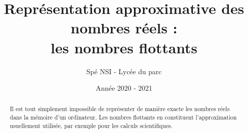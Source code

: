 



\author{Spé NSI - Lycée du parc}  %
\title{Représentation approximative des nombres réels : \\ {les nombres flottants}}  %
\date{Année 2020 - 2021} %
\renewcommand{\thesection}{\Roman{section}}  %
\pagestyle{fancy}



\fancyfoot[C]{\thepage} %
\fancyfoot[L]{} %
\fancyfoot[R]{} %
\newcommand{\p}[1]{ \left( #1 \right)}   %
\newcommand\abs[1]{|{#1}|}
\newcommand{\intent}[2]{[\![ #1 , #2 ]\!]} %
\newcommand{\pe}[1]{ \left\lfloor #1 \right\rfloor} %

\maketitle  %
\vspace{0.2cm}
\maketitle  %
\thispagestyle{empty}

\renewcommand{\abstractname}{Introduction\hfill}
\begin{abstract} 
Il est tout simplement impossible de représenter de manière exacte les nombres réels dans la mémoire d'un ordinateur. Les nombres flottants en constituent l'approximation usuellement utilisée, par exemple pour les calculs scientifiques.
\end{abstract}    
\vskip 1cm

